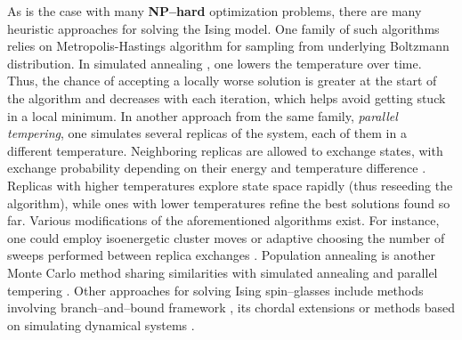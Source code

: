As is the case with many \textbf{NP--hard} optimization problems, there are many heuristic
approaches for solving the Ising model. One family of such algorithms relies on Metropolis-Hastings
\cite{beichl} algorithm for sampling from underlying Boltzmann distribution. In simulated annealing
\cite{cook, isakov}, one lowers the temperature over time. Thus, the chance of accepting a locally
worse solution is greater at the start of the algorithm and decreases with each iteration, which
helps avoid getting stuck in a local minimum. In another approach from the same family,
\emph{parallel tempering}, one simulates several replicas of the system, each of them in a different
temperature. Neighboring replicas are allowed to exchange states, with exchange probability
depending on their energy and temperature difference \cite{swendsen}. Replicas with higher
temperatures explore state space rapidly (thus reseeding the algorithm), while ones with lower
temperatures refine the best solutions found so far. Various modifications of the aforementioned
algorithms exist. For instance, one could employ isoenergetic cluster moves \cite{zhu} or adaptive
choosing the number of sweeps performed between replica exchanges \cite{bittner}. Population
annealing is another Monte Carlo method sharing similarities with simulated annealing and parallel
tempering \cite{wang}. Other approaches for solving Ising spin--glasses include methods involving
branch--and--bound framework \cite{rendl}, its chordal extensions \cite{baccari} or methods based on
simulating dynamical systems \cite{sheldon}.
